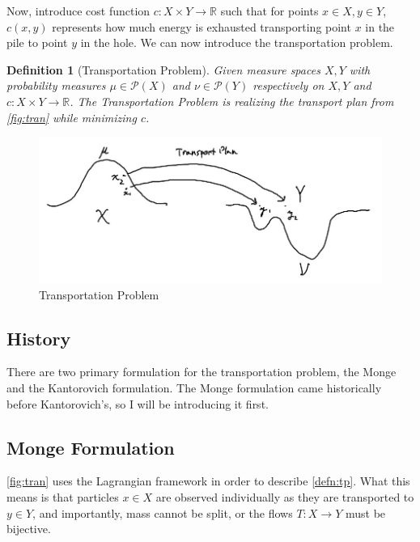 \documentclass[12pt]{article}
\newcommand{\comp}[2]{
\vspace{0.2in}\begin{mdframed}[
  backgroundcolor=problem,
  userdefinedwidth=10cm,
  align=center,
  skipabove=\topsep,
  skipbelow=\topsep
  ]
  \emph{{#1}:\newline} {#2}
\end{mdframed}}
\theoremstyle{plain}
\newtheorem{defn}{Definition}[section]
\numberwithin{equation}{section}
\begin{document}
Now, introduce cost function $c: X\times Y \to \mathbb{R}$ such that for points $x\in X,y\in Y$, $c(x,y)$ represents how much energy is exhausted transporting point $x$ in the pile to point $y$ in the hole.
We can now introduce the transportation problem.
\begin{defn}[Transportation Problem]\label{defn:tp}
Given measure spaces $X,Y$ with probability measures $\mu\in \mathcal{P}(X)$ and $\nu\in\mathcal{P}(Y)$ respectively on $X,Y$ and $c: X\times Y\to \mathbb{R}$. The Transportation Problem is realizing the transport plan from \autoref{fig:tran} while minimizing $c$.
\end{defn}
\begin{figure}[H]
  \center
  \includegraphics[scale=0.3]{transport.jpg}
  \caption{Transportation Problem}
  \label{fig:tran}
\end{figure}
\subsection{History}
There are two primary formulation for the transportation problem, the Monge and the Kantorovich formulation. The Monge formulation came historically before Kantorovich's, so I will be introducing it first.
\subsection{Monge Formulation}
\autoref{fig:tran} uses the Lagrangian framework in order to describe \autoref{defn:tp}. What this means is that particles $x\in X$ are observed individually as they are transported to $y\in Y$, and importantly, mass cannot be split, or the flows $T: X\to Y$ must be bijective.
\end{document}
